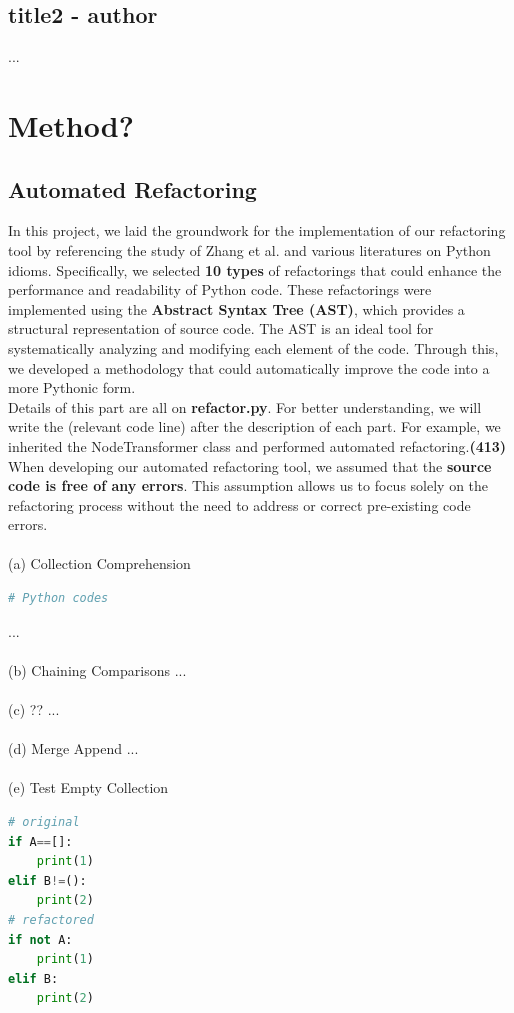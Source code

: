 \documentclass[11pt]{article}
\begin{document}
\subsection{title2 - author}
...\\

\section{Method?}
\subsection{Automated Refactoring}
In this project, we laid the groundwork for the implementation of our refactoring tool by referencing the study of Zhang et al. and various literatures on Python idioms. Specifically, we selected \textbf{10 types} of refactorings that could enhance the performance and readability of Python code. These refactorings were implemented using the \textbf{Abstract Syntax Tree (AST)}, which provides a structural representation of source code. The AST is an ideal tool for systematically analyzing and modifying each element of the code. Through this, we developed a methodology that could automatically improve the code into a more Pythonic form.\\
Details of this part are all on \textbf{refactor.py}. For better understanding, we will write the (relevant code line) after the description of each part. For example, we inherited the NodeTransformer class and performed automated refactoring.\textbf{(413)}\\
When developing our automated refactoring tool, we assumed that the \textbf{source code is free of any errors}. This assumption allows us to focus solely on the refactoring process without the need to address or correct pre-existing code errors.\\ \\
(a) Collection Comprehension
\begin{lstlisting}[language=python]
# Python codes
\end{lstlisting}
...\\ \\
(b) Chaining Comparisons
...\\ \\
(c) ??
...\\ \\
(d) Merge Append
...\\ \\
(e) Test Empty Collection
\begin{lstlisting}[language=python]
# original
if A==[]:
    print(1)
elif B!=():
    print(2)
# refactored
if not A:
    print(1)
elif B:
    print(2)
\end{lstlisting}
\end{document}
